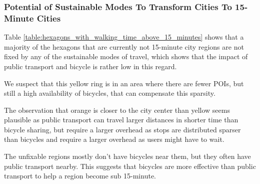 \subsubsection{Potential of Sustainable Modes To Transform Cities To 15-Minute Cities}

Table \ref{table:hexagons_with_walking_time_above_15_minutes} shows that a majority of the hexagons that are currently not 15-minute city regions are not fixed by any of the sustainable modes of travel, which shows that the impact of public transport and bicycle is rather low in this regard.

We suspect that this yellow ring is in an area where there are fewer POIs, but still a high availability of bicycles, that can compensate this sparsity.

The observation that orange is closer to the city center than yellow seems plausible as public transport can travel larger distances in shorter time than bicycle sharing, but require a larger overhead as stops are distributed sparser than bicycles and require a larger overhead as users might have to wait.

The unfixable regions mostly don't have bicycles near them, but they often have public transport nearby.
This suggests that bicycles are more effective than public transport to help a region become sub 15-minute.
